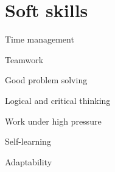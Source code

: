 \documentclass[a4paper,11pt]{article}
\begin{document}
\section{\textbf{Soft skills}}
\begin{itemize}[leftmargin=0.2in]
    \setlength{\itemsep}{0pt}
    \small{
        \item{Time management}\\
        \item{Teamwork}\\
        \item{Good problem solving}\\
        \item{Logical and critical thinking}\\
        \item{Work under high pressure}\\
        \item{Self-learning}\\
        \item{Adaptability}
        
    }
 \end{itemize}





\end{document}
